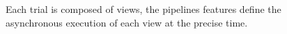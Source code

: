 \begin{figure}
\begin{centering}

\par\end{centering}
\caption[Stimuli delivery pipeline]{Each trial is composed of views, the pipelines features define the asynchronous execution of each view at the precise time.}
\label{fig:pipelines}
\end{figure}


